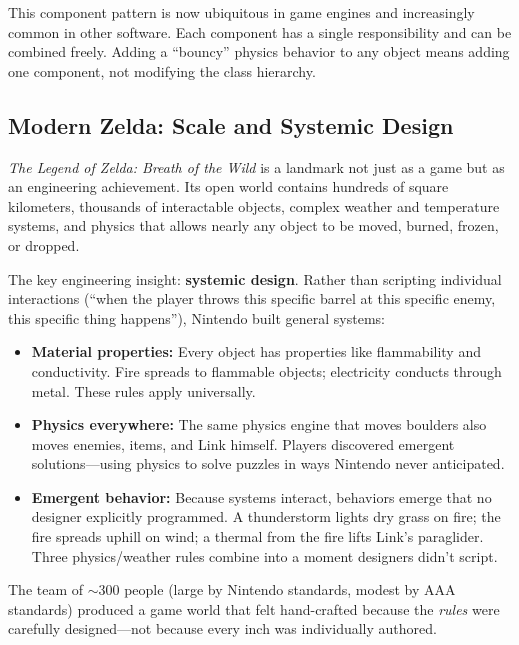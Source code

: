 \documentclass[11pt,letterpaper]{article}
\begin{document}
This component pattern is now ubiquitous in game engines and increasingly common in other software. Each component has a single responsibility and can be combined freely. Adding a ``bouncy'' physics behavior to any object means adding one component, not modifying the class hierarchy.

\subsection{Modern Zelda: Scale and Systemic Design}

\begin{historybox}
\textit{The Legend of Zelda: Breath of the Wild} is a landmark not just as a game but as an engineering achievement. Its open world contains hundreds of square kilometers, thousands of interactable objects, complex weather and temperature systems, and physics that allows nearly any object to be moved, burned, frozen, or dropped.

The key engineering insight: \textbf{systemic design}. Rather than scripting individual interactions (``when the player throws this specific barrel at this specific enemy, this specific thing happens''), Nintendo built general systems:

\begin{itemize}[itemsep=3pt]
    \item \textbf{Material properties:} Every object has properties like flammability and conductivity. Fire spreads to flammable objects; electricity conducts through metal. These rules apply universally.
    \item \textbf{Physics everywhere:} The same physics engine that moves boulders also moves enemies, items, and Link himself. Players discovered emergent solutions---using physics to solve puzzles in ways Nintendo never anticipated.
    \item \textbf{Emergent behavior:} Because systems interact, behaviors emerge that no designer explicitly programmed. A thunderstorm lights dry grass on fire; the fire spreads uphill on wind; a thermal from the fire lifts Link's paraglider. Three physics/weather rules combine into a moment designers didn't script.
\end{itemize}

The team of $\sim$300 people (large by Nintendo standards, modest by AAA standards) produced a game world that felt hand-crafted because the \textit{rules} were carefully designed---not because every inch was individually authored.
\end{historybox}
\end{document}
